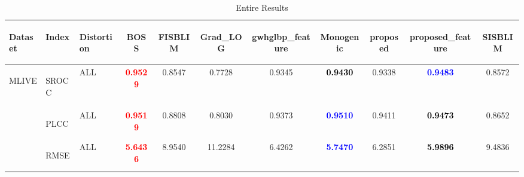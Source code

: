 \documentclass{article}
\begin{document}
\begin{table}
\scriptsize
\caption{Entire Results}
\label{tbl:whole}
\begin{tabular}{||l|l|l||cccccccc||}
\toprule
\toprule
\begin{turn}{-90}\textbf{Dataset}\end{turn}&\begin{turn}{-90}\textbf{Index}\end{turn}&\begin{turn}{-90}\textbf{Distortion}\end{turn}&\begin{turn}{-90}\textbf{BOSS}\end{turn}&\begin{turn}{-90}\textbf{FISBLIM}\end{turn}&\begin{turn}{-90}\textbf{Grad\_LOG}\end{turn}&\begin{turn}{-90}\textbf{gwhglbp\_feature}\end{turn}&\begin{turn}{-90}\textbf{Monogenic}\end{turn}&\begin{turn}{-90}\textbf{proposed}\end{turn}&\begin{turn}{-90}\textbf{proposed\_feature}\end{turn}&\begin{turn}{-90}\textbf{SISBLIM}\end{turn}\\
\midrule
\midrule
\multirow{4}{*}{\begin{turn}{-90}MLIVE\end{turn}}&\multirow{1}{*}{\begin{turn}{-90}SROCC\end{turn}}&ALL&\textbf{\textcolor{red}{0.9529}}&0.8547&0.7728&0.9345&\textbf{\textcolor{black}{0.9430}}&0.9338&\textbf{\textcolor{blue}{0.9483}}&0.8572\\
\cmidrule{2-11}\cmidrule{2-11}
&\multirow{1}{*}{\begin{turn}{-90}PLCC\end{turn}}&ALL&\textbf{\textcolor{red}{0.9519}}&0.8808&0.8030&0.9373&\textbf{\textcolor{blue}{0.9510}}&0.9411&\textbf{\textcolor{black}{0.9473}}&0.8652\\
\cmidrule{2-11}\cmidrule{2-11}
&\multirow{1}{*}{\begin{turn}{-90}RMSE\end{turn}}&ALL&\textbf{\textcolor{red}{5.6436}}&8.9540&11.2284&6.4262&\textbf{\textcolor{blue}{5.7470}}&6.2851&\textbf{\textcolor{black}{5.9896}}&9.4836\\

\end{tabular}
\end{table}
\end{document}
